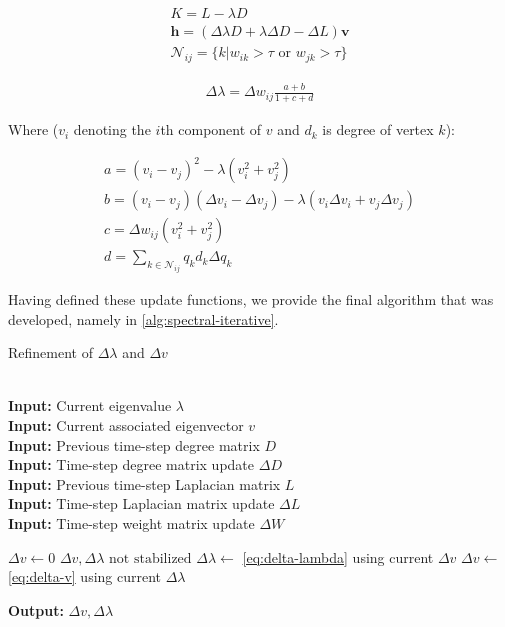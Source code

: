 \documentclass[journal]{IEEEtran}
\begin{document}
\begin{align}
    K = L - \lambda D \\
    \textbf{h} = (\Delta\lambda D + \lambda \Delta D - \Delta L)\textbf{v} \\
    \mathcal{N}_{ij} = \{k|w_{ik} > \tau \text{ or } w_{jk} > \tau\}
\end{align}

\begin{align}
    \Delta\lambda = \Delta w_{ij}\frac{a + b}{1 + c + d}\label{eq:delta-lambda}
\end{align}

Where ($v_i$ denoting the $i$th component of $v$ and $d_k$ is degree of vertex $k$):

\begin{align}
    a = (v_i - v_j)^2 - \lambda(v_i^2 + v_j^2) \\
    b = (v_i - v_j)(\Delta v_i - \Delta v_j) - \lambda(v_i\Delta v_i + v_j\Delta v_j) \\
    c = \Delta w_{ij}(v_i^2 + v_j^2) \\
    d = \sum_{k\in\mathcal{N}_{ij}} q_k d_k\Delta q_k
\end{align}

Having defined these update functions, we provide the final algorithm that was developed, namely in \ref{alg:spectral-iterative}.

\begin{algorithm}
\caption{Refinement of $\Delta\lambda$ and $\Delta v$ \cite{incremental}}\label{alg:refinement}
\begin{algorithmic}[1]
 \\
\textbf{Input:} Current eigenvalue $\lambda$ \\
\textbf{Input:} Current associated eigenvector $v$ \\
\textbf{Input:} Previous time-step degree matrix $D$ \\
\textbf{Input:} Time-step degree matrix update $\Delta D$ \\
\textbf{Input:} Previous time-step Laplacian matrix $L$ \\
\textbf{Input:} Time-step Laplacian matrix update $\Delta L$ \\
\textbf{Input:} Time-step weight matrix update $\Delta W$

\State $\Delta v \gets 0$
\While $\Delta v, \Delta\lambda \text{ not stabilized}$
    \State $\Delta\lambda \gets$ \ref{eq:delta-lambda} using current $\Delta v$ 
    \State $\Delta v \gets$ \ref{eq:delta-v} using current $\Delta \lambda$ 
\EndWhile

\textbf{Output:} $\Delta v, \Delta\lambda$
\EndProcedure
\end{algorithmic}
\end{algorithm}
\end{document}

